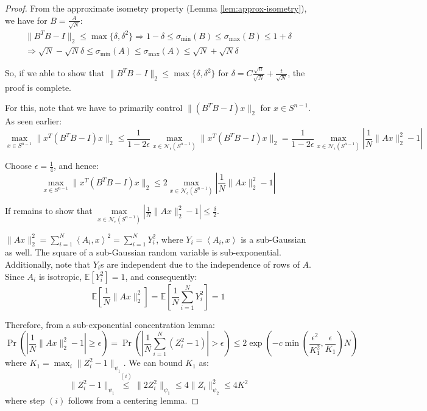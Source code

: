 \documentclass{article}
\theoremstyle{remark}
\newcommand{\Exp}{\mathbb{E}}
\newcommand{\inner}[2]{\left\langle #1, #2 \right\rangle}
\newcommand{\calN}{\mathcal{N}}
\begin{document}
\begin{proof}
From the approximate isometry property (Lemma \ref{lem:approx-isometry}), we have for \(B = \frac{A}{\sqrt{N}}\):
\begin{multline*}
\|B^{T}B - I\|_{2} \leq \max\{\delta, \delta^{2}\} \Rightarrow 1 - \delta \leq \sigma_{\min}(B) \leq \sigma_{\max}(B) \leq 1 + \delta \\
\Rightarrow \sqrt{N} - \sqrt{N}\delta \leq \sigma_{\min}(A) \leq \sigma_{\max}(A) \leq \sqrt{N} + \sqrt{N}\delta
\end{multline*}

So, if we able to show that \(\|B^{T}B - I\|_{2} \leq \max\{\delta, \delta^{2}\}\) for \(\delta = C\frac{\sqrt{n}}{\sqrt{N}} + \frac{t}{\sqrt{N}}\), the proof is complete.

For this, note that we have to primarily control \(\|(B^{T}B - I)x\|_{2}\) for \(x \in S^{n - 1}\). As seen earlier:
\begin{equation*}
\max_{x \in S^{n - 1}} \|x^{T}(B^{T}B - I)x\|_{2} \leq \frac{1}{1 - 2\epsilon} \max_{x \in \calN_{\epsilon}(S^{n - 1})} \|x^{T}(B^{T}B - I)x\|_{2} = \frac{1}{1 - 2\epsilon} \max_{x \in \calN_{\epsilon}(S^{n - 1})} \left|\frac{1}{N}\|Ax\|_{2}^{2} - 1\right|
\end{equation*}

Choose \(\epsilon = \frac{1}{4}\), and hence:
\begin{equation*}
\max_{x \in S^{n - 1}} \|x^{T}(B^{T}B - I)x\|_{2} \leq 2\max_{x \in \calN_{\epsilon}(S^{n - 1})} \left|\frac{1}{N}\|Ax\|_{2}^{2} - 1\right|
\end{equation*}

If remains to show that \(\max\limits_{x \in \calN_{\epsilon}(S^{n - 1})} \left|\frac{1}{N}\|Ax\|_{2}^{2} - 1\right| \leq \frac{\delta}{2}\).

\(\|Ax\|_{2}^{2} = \sum\limits_{i=1}^{N}\inner{A_{i}}{x}^{2} = \sum\limits_{i=1}^{N} Y_{i}^{2}\), where \(Y_{i} = \inner{A_{i}}{x}\) is a sub-Gaussian as well. The square of a sub-Gaussian random variable is sub-exponential. Additionally, note that \(Y_{i}\)s are independent due to the independence of rows of \(A\). Since \(A_{i}\) is isotropic, \(\Exp[Y_{i}^{2}] = 1\), and consequently:
\begin{equation*}
\Exp\left[\frac{1}{N}\|Ax\|_{2}^{2}\right] = \Exp\left[\frac{1}{N}\sum_{i=1}^{N}Y_{i}^{2}\right] = 1
\end{equation*}

Therefore, from a sub-exponential concentration lemma:
\begin{equation*}
\Pr\left(\left|\frac{1}{N}\|Ax\|_{2}^{2} - 1\right| \geq \epsilon\right) = \Pr\left(\left|\frac{1}{N}\sum_{i=1}^{N}(Z_{i}^{2} - 1)\right| > \epsilon\right) \leq 2\exp\left(-c\min\left(\frac{\epsilon^{2}}{K_{1}^{2}}, \frac{\epsilon}{K_{1}}\right)N\right)
\end{equation*}
where \(K_{1} = \max_{i} \|Z_{i}^{2} - 1\|_{\psi_{1}}\). We can bound \(K_{1}\) as:
\begin{equation*}
\|Z_{i}^{2} - 1\|_{\psi_{1}} \overset{(i)}\leq \|2Z_{i}^{2}\|_{\psi_{1}} \leq 4\|Z_{i}\|_{\psi_{2}}^{2} \leq 4K^{2}
\end{equation*}
where step \((i)\) follows from a centering lemma.
\end{proof}
\end{document}
